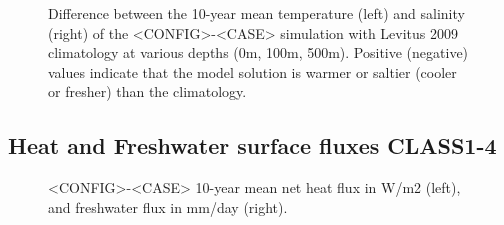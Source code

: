 \documentclass[12pt]{article}
\begin{document}
\begin{figure}[H]
\begin{center}
\begin{minipage}{0.47\linewidth}
\end{minipage}
\hfill
\begin{minipage}{0.47\linewidth}
\end{minipage}
\begin{minipage}{0.47\linewidth}
\end{minipage}
\hfill
\begin{minipage}{0.47\linewidth}
\end{minipage}
\begin{minipage}{0.47\linewidth}
\end{minipage}
\hfill
\begin{minipage}{0.47\linewidth}
\end{minipage}
\caption{Difference between the 10-year mean temperature (left) and salinity (right) of the <CONFIG>-<CASE> simulation with Levitus 2009 climatology at various depths (0m, 100m, 500m). Positive (negative) values indicate that the model solution is warmer or saltier (cooler or fresher) than the climatology.}
\end{center}
\end{figure}

\subsection{Heat and Freshwater surface fluxes CLASS1-4}

\begin{figure}[H]
\begin{center}
\begin{minipage}{0.47\linewidth}
\end{minipage}
\hfill
\begin{minipage}{0.47\linewidth}
\end{minipage}
\caption{<CONFIG>-<CASE> 10-year mean net heat flux in W/m2 (left), and freshwater flux in mm/day (right).}
\end{center}
\end{figure}
\end{document}
